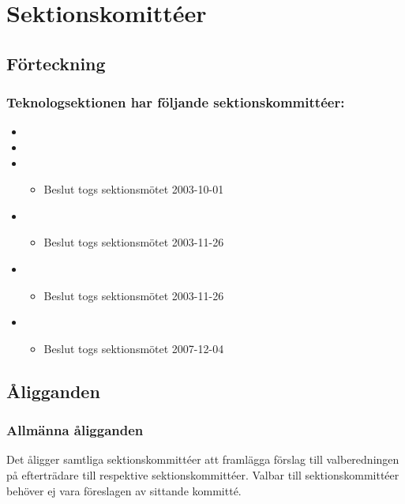 \section{Sektionskomittéer}

\subsection{Förteckning}

\subsubsection{Teknologsektionen har följande sektionskommittéer:}

\begin{itemize}
	\item \SEXITFULL
	\item \NOLLKITFULL
	\item \PRITFULL
	\begin{itemize}
		\item Beslut togs sektionsmötet 2003-10-01
	\end{itemize}
	\item \FRITIDFULL
	\begin{itemize}
		\item Beslut togs sektionsmötet 2003-11-26
	\end{itemize}
	\item \ARMITFULL
	\begin{itemize}
		\item Beslut togs sektionsmötet 2003-11-26
	\end{itemize}
	\item \DIGITFULL
	\begin{itemize}
		\item Beslut togs sektionsmötet 2007-12-04 
	\end{itemize}

\end{itemize}

\subsection{Åligganden}
\subsubsection{Allmänna åligganden}
Det åligger samtliga sektionskommittéer att framlägga förslag till valberedningen på efterträdare till respektive sektionskommittéer. Valbar till sektionskommittéer behöver ej vara föreslagen av sittande kommitté.

\newpage

\newpage

\newpage

\newpage

\newpage

\newpage

\newpage


